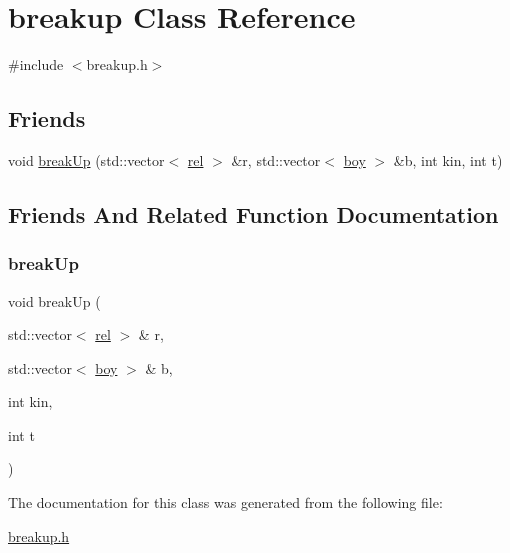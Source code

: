 \hypertarget{classbreakup}{}\section{breakup Class Reference}
\label{classbreakup}


{\ttfamily \#include $<$breakup.\+h$>$}

\subsection*{Friends}
\begin{DoxyCompactItemize}
\item 
void \hyperlink{classbreakup_a72fa040ab00ddfad8b81bda5bf4a7ff4}{break\+Up} (std\+::vector$<$ \hyperlink{classrel}{rel} $>$ \&r, std\+::vector$<$ \hyperlink{classboy}{boy} $>$ \&b, int kin, int t)
\end{DoxyCompactItemize}


\subsection{Friends And Related Function Documentation}
\mbox{\label{classbreakup_a72fa040ab00ddfad8b81bda5bf4a7ff4}} 
\subsubsection{\texorpdfstring{break\+Up}{breakUp}}
{\footnotesize\ttfamily void break\+Up (\begin{DoxyParamCaption}\item[{std\+::vector$<$ \hyperlink{classrel}{rel} $>$ \&}]{r,  }\item[{std\+::vector$<$ \hyperlink{classboy}{boy} $>$ \&}]{b,  }\item[{int}]{kin,  }\item[{int}]{t }\end{DoxyParamCaption})\hspace{0.3cm}{\ttfamily [friend]}}



The documentation for this class was generated from the following file\+:\begin{DoxyCompactItemize}
\item 
\hyperlink{breakup_8h}{breakup.\+h}\end{DoxyCompactItemize}
